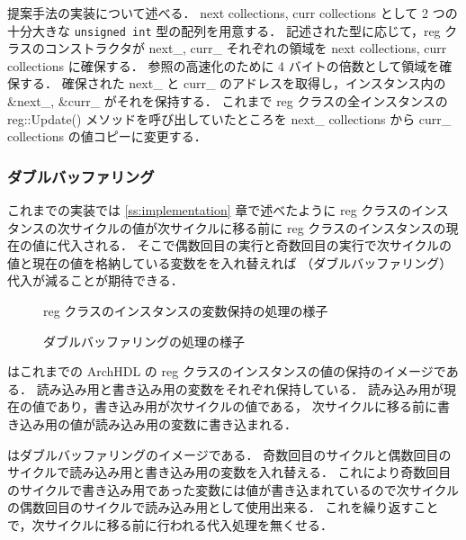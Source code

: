 提案手法の実装について述べる．
next collections, curr collections として 2 つの十分大きな \verb/unsigned int/ 型の配列を用意する．
記述された型に応じて，reg クラスのコンストラクタが next\_, curr\_ それぞれの領域を next collections, curr collections に確保する．
参照の高速化のために 4 バイトの倍数として領域を確保する．
確保された next\_ と curr\_ のアドレスを取得し，インスタンス内の \&next\_, \&curr\_ がそれを保持する．
これまで reg クラスの全インスタンスの reg::Update() メソッドを呼び出していたところを next\_ collections から curr\_ collections の値コピーに変更する．


\subsubsection{ダブルバッファリング}

これまでの実装では \ref{ss:implementation} 章で述べたように
reg クラスのインスタンスの次サイクルの値が次サイクルに移る前に reg クラスのインスタンスの現在の値に代入される．
そこで偶数回目の実行と奇数回目の実行で次サイクルの値と現在の値を格納している変数をを入れ替えれば
（ダブルバッファリング）代入が減ることが期待できる．

\begin{figure}[t]
 \begin{center}
  
 \end{center}
 \caption{reg クラスのインスタンスの変数保持の処理の様子}
 \label{fig:reg_curr_next}
\end{figure}

\begin{figure}[t]
 \begin{center}
  
 \end{center}
 \caption{ダブルバッファリングの処理の様子}
 \label{fig:double_buffer}
\end{figure}

 はこれまでの ArchHDL の reg クラスのインスタンスの値の保持のイメージである．
読み込み用と書き込み用の変数をそれぞれ保持している．
読み込み用が現在の値であり，書き込み用が次サイクルの値である，
次サイクルに移る前に書き込み用の値が読み込み用の変数に書き込まれる．

はダブルバッファリングのイメージである．
奇数回目のサイクルと偶数回目のサイクルで読み込み用と書き込み用の変数を入れ替える．
これにより奇数回目のサイクルで書き込み用であった変数には値が書き込まれているので次サイクルの偶数回目のサイクルで読み込み用として使用出来る．
これを繰り返すことで，次サイクルに移る前に行われる代入処理を無くせる．

